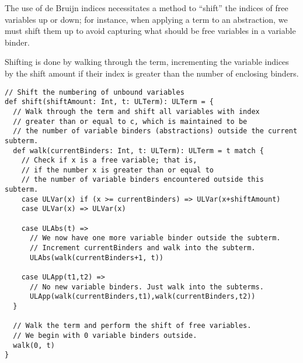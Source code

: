 \documentclass[11pt]{article}
\theoremstyle{definition}
\begin{document}
The use of de Bruijn indices necessitates a method to
“shift” the indices of free variables up or down;
for instance, when applying a term to an abstraction,
we must shift them up to avoid capturing what should be free variables
in a variable binder.

Shifting is done by walking through the term,
incrementing the variable indices by the shift amount
if their index is greater than the number of enclosing binders.
\begin{verbatim}
// Shift the numbering of unbound variables
def shift(shiftAmount: Int, t: ULTerm): ULTerm = {
  // Walk through the term and shift all variables with index
  // greater than or equal to c, which is maintained to be
  // the number of variable binders (abstractions) outside the current subterm.
  def walk(currentBinders: Int, t: ULTerm): ULTerm = t match {
    // Check if x is a free variable; that is,
    // if the number x is greater than or equal to
    // the number of variable binders encountered outside this subterm.
    case ULVar(x) if (x >= currentBinders) => ULVar(x+shiftAmount)
    case ULVar(x) => ULVar(x)

    case ULAbs(t) =>
      // We now have one more variable binder outside the subterm.
      // Increment currentBinders and walk into the subterm.
      ULAbs(walk(currentBinders+1, t))

    case ULApp(t1,t2) =>
      // No new variable binders. Just walk into the subterms.
      ULApp(walk(currentBinders,t1),walk(currentBinders,t2))
  }

  // Walk the term and perform the shift of free variables.
  // We begin with 0 variable binders outside.
  walk(0, t)
}
\end{verbatim}
\end{document}
